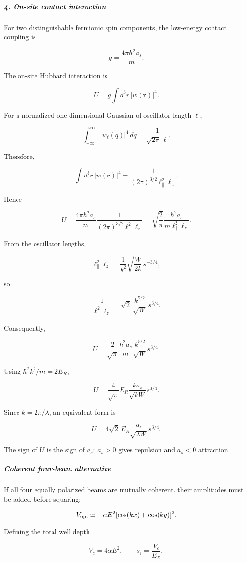 \subparagraph*{4. On-site contact interaction}

For two distinguishable fermionic spin components, the low-energy contact coupling is

\[
g=\frac{4\pi\hbar^2a_s}{m}.
\]

The on-site Hubbard interaction is

\[
U=g\int d^3r\,|w(\mathbf r)|^4.
\]

For a normalized one-dimensional Gaussian of oscillator length $\ell$,

\[
\int_{-\infty}^{\infty}|w_\ell(q)|^4\,dq = \frac{1}{\sqrt{2\pi}\,\ell}.
\]

Therefore,

\[
\int d^3r\,|w(\mathbf r)|^4 = \frac{1}{ (2\pi)^{3/2}\ell_\parallel^2\ell_z }.
\]

Hence

\[
U = \frac{4\pi\hbar^2a_s}{m} \frac{1}{ (2\pi)^{3/2}\ell_\parallel^2\ell_z } = \sqrt{\frac{2}{\pi}} \frac{\hbar^2a_s}{ m\ell_\parallel^2\ell_z }.
\]

From the oscillator lengths,

\[
\ell_\parallel^2\ell_z = \frac{1}{k^2} \sqrt{\frac{W}{2k}}\, s^{-3/4},
\]

so

\[
\frac{1}{\ell_\parallel^2\ell_z} = \sqrt{2}\, \frac{k^{5/2}}{\sqrt W}\, s^{3/4}.
\]

Consequently,

\[
U = \frac{2}{\sqrt{\pi}} \frac{\hbar^2a_s}{m} \frac{k^{5/2}}{\sqrt W} s^{3/4}.
\]

Using $\hbar^2k^2/m=2E_R$,

\[
{ U= \frac{4}{\sqrt{\pi}}E_R \frac{ka_s}{\sqrt{kW}} s^{3/4} }.
\]

Since $k=2\pi/\lambda$, an equivalent form is

\[
{ U= 4\sqrt{2}\,E_R \frac{a_s}{\sqrt{\lambda W}} s^{3/4} }.
\]

The sign of $U$ is the sign of $a_s$: $a_s>0$ gives repulsion and $a_s<0$ attraction.

\subparagraph*{Coherent four-beam alternative}

If all four equally polarized beams are mutually coherent, their amplitudes must be added before squaring:

\[
V_{\rm opt} \simeq -\alpha E^2[\cos(kx)+\cos(ky)]^2.
\]

Defining the total well depth

\[
V_c=4\alpha E^2, \qquad s_c=\frac{V_c}{E_R},
\]


